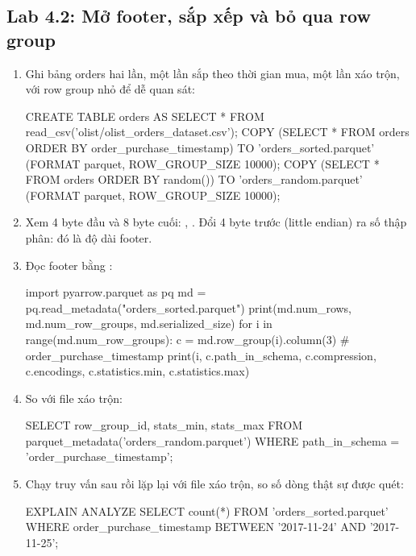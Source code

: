 \subsection{Lab 4.2: Mở footer, sắp xếp và bỏ qua row group}
\begin{enumerate}
  \item Ghi bảng orders hai lần, một lần sắp theo thời gian mua, một lần xáo trộn, với row group nhỏ để dễ quan sát:
\begin{codeblock}
CREATE TABLE orders AS SELECT * FROM read_csv('olist/olist_orders_dataset.csv');
COPY (SELECT * FROM orders ORDER BY order_purchase_timestamp)
  TO 'orders_sorted.parquet' (FORMAT parquet, ROW_GROUP_SIZE 10000);
COPY (SELECT * FROM orders ORDER BY random())
  TO 'orders_random.parquet' (FORMAT parquet, ROW_GROUP_SIZE 10000);
\end{codeblock}
  \item Xem 4 byte đầu và 8 byte cuối: , . Đổi 4 byte trước  (little endian) ra số thập phân: đó là độ dài footer.
  \item Đọc footer bằng :
\begin{codeblock}
import pyarrow.parquet as pq
md = pq.read_metadata("orders_sorted.parquet")
print(md.num_rows, md.num_row_groups, md.serialized_size)
for i in range(md.num_row_groups):
    c = md.row_group(i).column(3)   # order_purchase_timestamp
    print(i, c.path_in_schema, c.compression, c.encodings, c.statistics.min, c.statistics.max)
\end{codeblock}
  \item So với file xáo trộn:
\begin{codeblock}
SELECT row_group_id, stats_min, stats_max
FROM parquet_metadata('orders_random.parquet')
WHERE path_in_schema = 'order_purchase_timestamp';
\end{codeblock}
  \item Chạy truy vấn sau rồi lặp lại với file xáo trộn, so số dòng thật sự được quét:
\begin{codeblock}
EXPLAIN ANALYZE SELECT count(*) FROM 'orders_sorted.parquet'
WHERE order_purchase_timestamp BETWEEN '2017-11-24' AND '2017-11-25';
\end{codeblock}
\end{enumerate}

